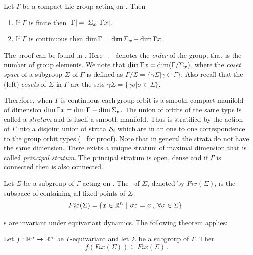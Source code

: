 \begin{proposition}
 \label{pro:dimOrb}
 Let $\Gamma$ be a compact Lie group acting on . Then
 \begin{enumerate}
  \item If $\Gamma$ is finite then $|\Gamma|=|\Sigma_{x}||\Gamma x|$.
  \item If $\Gamma$ is continuous then $\dim \Gamma = \dim \Sigma_{x}+\dim \Gamma x$.
 \end{enumerate}
\end{proposition}
The proof can be found in . Here $|\, .\, |$ denotes
the \emph{order} of the group, that is the number of group elements.
We note that
$\dim\Gamma x =\dim(\Gamma/\Sigma_{x})$, where the \emph{coset space} of
a subgroup $\Sigma$  of $\Gamma$ is defined as
$\Gamma/\Sigma=\{\gamma\Sigma|\gamma\in\Gamma\}$.
Also recall that the (left) \emph{cosets} of $\Sigma$ in $\Gamma$ are the sets
$\gamma\Sigma=\{\gamma\sigma|\sigma\in\Sigma\}$.


Therefore, when $\Gamma$ is continuous each group orbit is a smooth compact manifold of dimension
$\dim \Gamma x=\dim \Gamma-\dim \Sigma_{x}$. The union of orbits of the same type is called a \emph{stratum}
and is itself a smooth manifold. Thus  is stratified by the action of $\Gamma$ into
a disjoint union of strata $\mathcal{S}_{i}$ which are in an one to one correspondence to the group orbit types (\cf~ for proof).
Note that in general the strata do not have the same dimension. There exists a unique stratum  of maximal
dimension that is called \emph{principal stratum}. The principal stratum is open, dense
and if $\Gamma$ is connected then  is also connected.

\begin{definition}
 \label{def:fixedsp}
  Let $\Sigma$ be a subgroup of $\Gamma$ acting on . The \fixedsp\ of $\Sigma$,
 denoted by $Fix(\Sigma)$, is the subspace of  containing all fixed points of $\Sigma$:
\[
	Fix(\Sigma)=\{x\in\mathbb{R}^{n}\ |\ \sigma x = x\,,\ \forall \sigma\in\Sigma\}\,.
\]
\end{definition}

\Fixedsp s are invariant under equivariant dynamics. The following theorem applies:

\begin{theorem}
 Let $f:\mathbb{R}^{n}\rightarrow\mathbb{R}^{n}$ be $\Gamma$-equivariant and let $\Sigma$ be a subgroup of $\Gamma$. Then
\[
 f\left(Fix(\Sigma)\right)\subseteq Fix(\Sigma)\,.
\]
\end{theorem}


